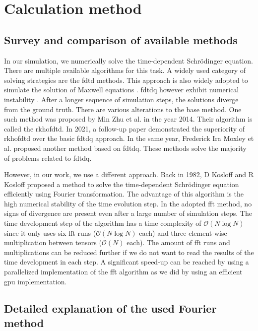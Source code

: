 \section{Calculation method}
\label{sec:used_method}

\subsection{Survey and comparison of available methods}

In our simulation, we numerically solve the time-dependent Schrödinger equation.
There are multiple available algorithms for this task.
A widely used category of solving strategies are the \acrfull{fdtd} methods.
This approach is also widely adopted to simulate the solution of Maxwell equations \cite{maxwell1865, Ulf2001}.
\acrfull{fdtdq} however exhibit numerical instability \cite{Soriano2004}.
After a longer sequence of simulation steps, the solutions diverge from the ground truth.
There are various alterations to the base method.
One such method was proposed by Min Zhu et al. \cite{Zhu2014} in the year 2014.
Their algorithm is called the \acrfull{rkhofdtd}.
In 2021, a follow-up paper \cite{Zhu_Wang_2021} demonstrated the superiority of \acrshort{rkhofdtd} over the basic \acrshort{fdtdq} approach.
In the same year, Frederick Ira Moxley et al. \cite{MOXLEY20122434} proposed another method based on \acrshort{fdtdq}.
These methods solve the majority of problems related to \acrshort{fdtdq}.

However, in our work, we use a different approach.
Back in 1982, D Kosloff and R Kosloff proposed a method \cite{KOSLOFF198335} to solve the time-dependent Schrödinger equation efficiently using Fourier transformation.
The advantage of this algorithm is the high numerical stability of the time evolution step.
In the adopted \acrshort{fft} method, no signs of divergence are present even after a large number of simulation steps.
The time development step of the algorithm has a time complexity of $\mathcal{O}(N\log N)$ since it only uses six \acrshort{fft} runs ($\mathcal{O}(N\log N)$ each) and three element-wise multiplication between tensors ($\mathcal{O}(N)$ each).
The amount of \acrshort{fft} runs and multiplications can be reduced further if we do not want to read the results of the time development in each step.
A significant speed-up can be reached by using a parallelized implementation of the \acrshort{fft} algorithm as we did by using an efficient \acrshort{gpu} implementation.

\subsection{Detailed explanation of the used Fourier method}


